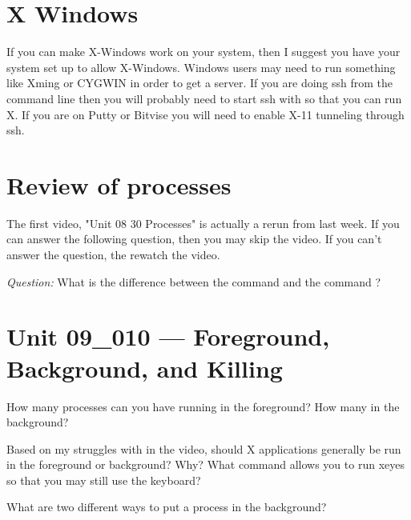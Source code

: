 \documentclass[letterpaper,12pt]{exam}
\newcommand{\unit}{Unit 09}
\begin{document}
\section*{X Windows} %
If you can make X-Windows work on your system, then I suggest you have your system set up to allow X-Windows.  Windows users may need to run something like Xming or CYGWIN in order to get a server.
If you are doing ssh from the command line then you will probably need to start ssh with  so that you can run X. If you are on Putty or Bitvise you will need to enable X-11 tunneling through ssh.

\begin {questions}

\section*{Review of processes} %

\begin{samepage}
\question The first video,  "Unit 08 30 Processes" is actually a rerun from last week.  If you can answer the following question, then you may skip the video.  If you can't answer the question, the rewatch the video. \par \textit{Question:} What is the difference between the command  and the command ?
\vspace{5mm}
\end{samepage}

\section*{\unit\_010 --- Foreground, Background, and Killing}

\begin{samepage}
\question How many processes can you have running in the foreground?  How many in the background?
\vspace{5mm}
\end{samepage}

\begin{samepage}
\question Based on my struggles with  in the video, should X applications generally be run in the foreground or background?  Why?  What command allows you to run xeyes so that you may still use the keyboard? 
\vspace{5mm}
\end{samepage}

\begin{samepage}
\question What are two different ways to put a process in the background? 
\vspace{5mm}
\end{samepage}


\end{questions}
\end{document}
